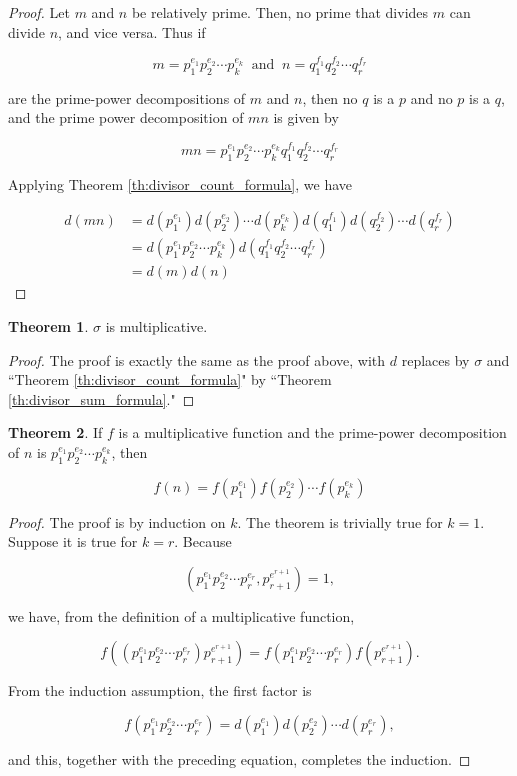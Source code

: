 \documentclass{article}
\theoremstyle{definition} %
\newtheorem{theorem}{Theorem}[section] %
\theoremstyle{definition}
\theoremstyle{definition}
\theoremstyle{definition}
\begin{document}
  \begin{proof}
    Let $m$ and $n$ be relatively prime. Then, no prime that divides $m$ can divide $n$,
    and vice versa. Thus if
    
    \[ m = p_1^{e_1}p_2^{e_2}\cdots p_k^{e_k} \;\;\text{and}\;\;n = q_1^{f_1}q_2^{f_2}\cdots q_r^{f_r} \]
    
    are the prime-power decompositions of $m$ and $n$, then no $q$ is a $p$ and no $p$ is a $q$,
    and the prime power decomposition of $mn$ is given by
    
    \[ mn = p_1^{e_1}p_2^{e_2}\cdots p_k^{e_k}q_1^{f_1}q_2^{f_2}\cdots q_r^{f_r} \]
    
    Applying Theorem \ref{th:divisor_count_formula}, we have
    
    \begin{align*}
       d(mn) &= d(p_1^{e_1})d(p_2^{e_2})\cdots d(p_k^{e_k})d(q_1^{f_1})d(q_2^{f_2})\cdots d(q_r^{f_r}) \\
         &= d(p_1^{e_1}p_2^{e_2}\cdots p_k^{e_k})d(q_1^{f_1}q_2^{f_2}\cdots q_r^{f_r}) \\
         &= d(m)d(n)
    \end{align*}
  \end{proof}
  
  \begin{theorem}
    $\sigma$ is multiplicative.
  \end{theorem}
  
  \begin{proof}
    The proof is exactly the same as the proof above, with $d$ replaces by $\sigma$ and
    ``Theorem \ref{th:divisor_count_formula}" by ``Theorem \ref{th:divisor_sum_formula}."
  \end{proof}
  
  \begin{theorem}
    If $f$ is a multiplicative function and the prime-power decomposition of $n$ is
    $p_1^{e_1}p_2^{e_2}\cdots p_k^{e_k}$, then
    
    \[ f(n) = f(p_1^{e_1})f(p_2^{e_2})\cdots f(p_k^{e_k}) \]
  \end{theorem}
  
  \begin{proof}
    The proof is by induction on $k$. The theorem is trivially true for $k= 1$. Suppose
    it is true for $k = r$. Because
    
    \[ (p_1^{e_1}p_2^{e_2}\cdots p_r^{e_r}, p_{r+1}^{e^{r+1}}) = 1, \]
    
    we have, from the definition of a multiplicative function,
    
    \[ f((p_1^{e_1}p_2^{e_2}\cdots p_r^{e_r}) p_{r+1}^{e^{r+1}}) = f(p_1^{e_1}p_2^{e_2}\cdots p_r^{e_r})f(p_{r+1}^{e^{r+1}}). \]
    
    From the induction assumption, the first factor is
    
    \[ f(p_1^{e_1}p_2^{e_2}\cdots p_r^{e_r}) = d(p_1^{e_1})d(p_2^{e_2})\cdots d(p_r^{e_r}), \]
    
    and this, together with the preceding equation, completes the induction.
  \end{proof}
  
\end{document}

